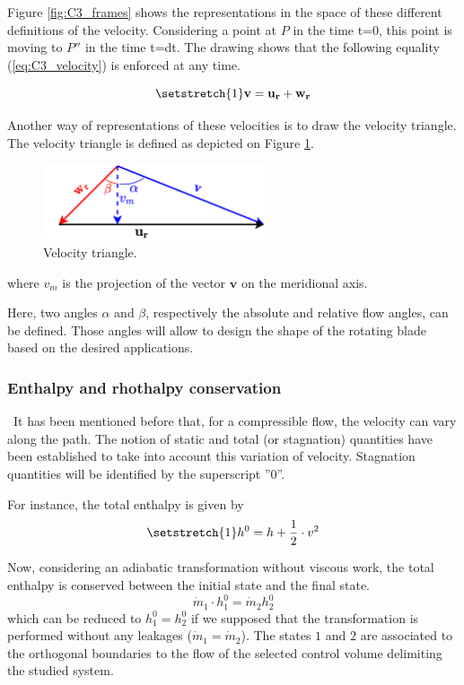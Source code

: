 Figure \ref{fig:C3_frames} shows the representations in the space of these different definitions of the velocity. Considering a point at $P$ in the time t=0, this point is moving to \(P''\) in the time t=dt.  
The drawing shows that the following equality (\ref{eq:C3_velocity}) is enforced at any time.

\begin{equation}
    \setstretch{1}
    \mathbf{v} = \mathbf{u_r} + \mathbf{w_r} \label{eq:C3_velocity}
\end{equation}

Another way of representations of these velocities is to draw the velocity triangle. The velocity triangle is defined as depicted on Figure \ref{fig:C3_vtriang}.

\begin{figure}[h]
    \centering
    \includegraphics[width=0.6\textwidth]{Vtriangle.png}
    \caption{Velocity triangle.}
    \label{fig:C3_vtriang}
\end{figure}
where $v_m$ is the projection of the vector $\mathbf{v}$ on the meridional axis.

Here, two angles $\alpha$ and $\beta$, respectively the absolute and relative flow angles, can be defined. Those angles will allow to design the shape of the rotating blade based on the desired applications. 

\subsubsection{Enthalpy and rhothalpy conservation}
\quad\ It has been mentioned before that, for a compressible flow, the velocity can vary along the path. The notion of static and total (or stagnation) quantities have been established to take into account this variation of velocity. Stagnation quantities will be identified by the superscript ''0''.

For instance, the total enthalpy is given by
\begin{equation}
    \setstretch{1}
    h^0 = h + \frac{1}{2}\cdot v^2\label{eq:C3_h0}
\end{equation}

Now, considering an adiabatic transformation without viscous work, the total enthalpy is conserved between the initial state and the final state.
\begin{equation}
    \dot{m}_1\cdot h_1^0 = \dot{m}_2 h_2^0 \label{eq:C3_hcons}
\end{equation}
which can be reduced to \(h_1^0 = h_2^0\) if we supposed that the transformation is performed without any leakages (\(\dot{m}_1=\dot{m}_2\)). The states \(1\) and \(2\) are associated to the orthogonal boundaries to the flow of the selected control volume delimiting the studied system.

